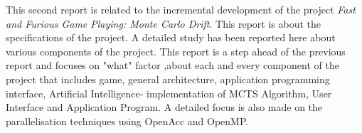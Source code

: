 This second report is related to the incremental development of the project \textit{Fast and Furious Game Playing: Monte Carlo Drift}. This report is about the specifications of the project.
A detailed study has been reported here about various components of the project. This report is a step ahead of the previous report and focuses on "what" factor ,about each and every component of the project that includes  game, general architecture, application programming interface, Artificial Intelligence- implementation of  MCTS Algorithm, User Interface and Application Program. A detailed focus is also made on the parallelisation techniques using OpenAcc and OpenMP.